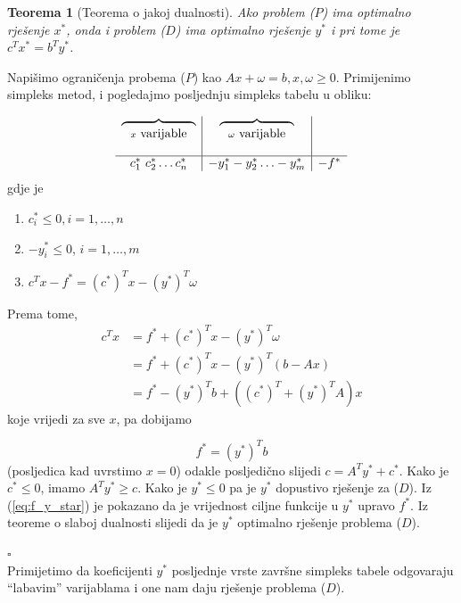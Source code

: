 \documentclass[a4paper, utf8, 11pt, colorlinks]{article}
\newtheorem{thm}{Teorema}
\newenvironment{proof}{{Dokaz:}}{\hfill$\square$}
\begin{document}
\begin{thm}[Teorema o jakoj dualnosti]
     Ako problem ($P$) ima optimalno rješenje $x^*$, onda i problem ($D$) ima optimalno rješenje $y^*$ i pri tome je $c^T x^* = b^T y^*$.
\end{thm}
\begin{proof}
         Napišimo ograničenja probema ($P$) kao $Ax + \omega = b, x, \omega \geq 0$.
         Primijenimo simpleks metod, i pogledajmo posljednju simpleks tabelu u obliku:
         
         $$\begin{array}{c |c | c}
         \overbrace{\ \ \ \ \ \hspace{1.5cm}}_{x \mbox{ varijable}}     &  \overbrace{\ \ \ \ \ \hspace{1.5cm}}_{\omega \mbox{ varijable}} &   \\
                                                           & &   \\
         \hline
             c_1^*\ c_2^* \ldots c_n^*            & -y_1^* -y_2^* \ldots -y_m^*  & -f^*
         \end{array}
         $$
   gdje je 
   \begin{enumerate}
       \item    $c^*_i \leq 0, i = 1,\ldots, n$ 
       \item    $-y_i^* \leq 0$, $i = 1,\ldots, m$
       \item  $c^T x - f^* = (c^*)^T x - (y^*)^T \omega$
    \end{enumerate}
    Prema tome, 
    \begin{align*}
           c^T x &=  f^* + (c^*)^T x - (y^*)^T \omega \\
                 &=  f^* + (c^*)^T x - (y^*)^T (b - Ax) \\
                 &= f^*  - (y^*)^T b +   ((c^*)^T + (y^*)^T A ) x
    \end{align*}
    koje vrijedi za sve $x$, pa dobijamo 
    
    \begin{equation}\label{eq:f_y_star}
        f^* = (y^*)^T b
    \end{equation}
     (posljedica kad uvrstimo $x = 0$) odakle posljedično slijedi 
    $ c = A^T y^* + c^*$. 
    Kako je $c^* \leq 0$, imamo  $A^T y^* \geq c$. Kako je $y^* \leq 0$ pa je $y^*$ dopustivo rješenje za  ($D$).  Iz (\ref{eq:f_y_star}) je pokazano da je vrijednost ciljne funkcije u $y^*$ upravo $f^*$. Iz teoreme o slaboj dualnosti slijedi da je $y^*$ optimalno rješenje problema  ($D$). 
    
\end{proof} \\
Primijetimo da koeficijenti $y^*$ posljednje vrste završne simpleks tabele odgovaraju  ``labavim''   varijablama i one nam daju rješenje problema  ($D$).  
\end{document}
